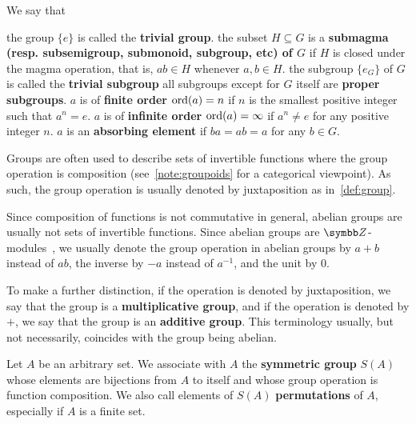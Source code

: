 \begin{definition}
  We say that
  \begin{defenum}
     the group \( \{ e \} \) is called the \textbf{trivial group}.
     the subset \( H \subseteq G \) is a \textbf{submagma (resp. subsemigroup, submonoid, subgroup, etc) of \( G \)} if \( H \) is closed under the magma operation, that is, \( ab \in H \) whenever \( a, b \in H \).
     the subgroup \( \{ e_G \} \) of \( G \) is called the \textbf{trivial subgroup}
     all subgroups except for \( G \) itself are \textbf{proper subgroups}.
     \( a \) is of \textbf{finite order} \( \operatorname{ord}(a) = n \) if \( n \) is the smallest positive integer such that \( a^n = e \).
     \( a \) is of \textbf{infinite order} \( \operatorname{ord}(a) = \infty \) if \( a^n \neq e \) for any positive integer \( n \).
     \( a \) is an \textbf{absorbing element} if \( ba = ab = a \) for any \( b \in G \).
  \end{defenum}
\end{definition}

\begin{note}\label{note:additive_group}
  Groups are often used to describe sets of invertible functions where the group operation is composition (see~\cref{note:groupoids} for a categorical viewpoint). As such, the group operation is usually denoted by juxtaposition as in~\cref{def:group}.

  Since composition of functions is not commutative in general, abelian groups are usually not sets of invertible functions. Since abelian groups are \( \BB{Z} \)-modules~, we usually denote the group operation in abelian groups by \( a + b \) instead of \( ab \), the inverse by \( -a \) instead of \( a^{-1} \), and the unit by \( 0 \).

  To make a further distinction, if the operation is denoted by juxtaposition, we say that the group is a \textbf{multiplicative group}, and if the operation is denoted by \( + \), we say that the group is an \textbf{additive group}. This terminology usually, but not necessarily, coincides with the group being abelian.
\end{note}

\begin{definition}\label{def:symmetric_group}
  Let \( A \) be an arbitrary set. We associate with \( A \) the \textbf{symmetric group} \( S(A) \) whose elements are bijections from \( A \) to itself and whose group operation is function composition. We also call elements of \( S(A) \) \textbf{permutations} of \( A \), especially if \( A \) is a finite set.
\end{definition}

